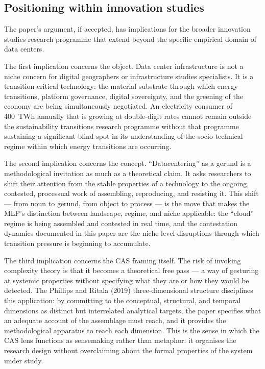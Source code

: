 \subsection{Positioning within innovation studies}

The paper's argument, if accepted, has implications for the broader innovation studies research programme that extend beyond the specific empirical domain of data centers.

The first implication concerns the object. Data center infrastructure is not a niche concern for digital geographers or infrastructure studies specialists. It is a transition-critical technology: the material substrate through which energy transitions, platform governance, digital sovereignty, and the greening of the economy are being simultaneously negotiated. An electricity consumer of 400~TWh annually that is growing at double-digit rates cannot remain outside the sustainability transitions research programme without that programme sustaining a significant blind spot in its understanding of the socio-technical regime within which energy transitions are occurring.

The second implication concerns the concept. ``Datacentering'' as a gerund is a methodological invitation as much as a theoretical claim. It asks researchers to shift their attention from the stable properties of a technology to the ongoing, contested, processual work of assembling, reproducing, and resisting it. This shift — from noun to gerund, from object to process — is the move that makes the MLP's distinction between landscape, regime, and niche applicable: the ``cloud'' regime is being assembled and contested in real time, and the contestation dynamics documented in this paper are the niche-level disruptions through which transition pressure is beginning to accumulate.

The third implication concerns the CAS framing itself. The risk of invoking complexity theory is that it becomes a theoretical free pass — a way of gesturing at systemic properties without specifying what they are or how they would be detected. The Phillips and Ritala (2019) three-dimensional structure disciplines this application: by committing to the conceptual, structural, and temporal dimensions as distinct but interrelated analytical targets, the paper specifies what an adequate account of the assemblage must reach, and it provides the methodological apparatus to reach each dimension. This is the sense in which the CAS lens functions as sensemaking rather than metaphor: it organises the research design without overclaiming about the formal properties of the system under study.
